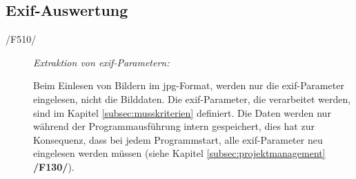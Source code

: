 \subsection{Exif-Auswertung}

	\begin{description}

		\item[/F510/] \textit{Extraktion von \gls{exif}-Parametern:}\par Beim Einlesen von Bildern im \gls{jpg}-Format, werden nur die \gls{exif}-Parameter eingelesen, nicht die Bilddaten. Die \gls{exif}-Parameter, die verarbeitet werden, sind im Kapitel \ref{subsec:musskriterien} definiert. Die Daten werden nur während der Programmausführung intern gespeichert, dies hat zur Konsequenz, dass bei jedem Programmstart, alle \gls{exif}-Parameter neu eingelesen werden müssen (siehe Kapitel \ref{subsec:projektmanagement} \textbf{/F130/}).
	
	\end{description}